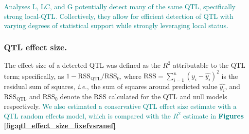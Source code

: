 \documentclass[9pt,twocolumn,twoside]{gsajnl}
\newcommand{\ie}{\emph{i.e.}\xspace}
\newcommand{\WV}[2]{\textcolor{red}{#1\footnote{\textcolor{red}{WV: #2}}}}
\newcommand{\GKinline}[1]{\textcolor{teal}{#1}}
\begin{document}
\GKinline{Analyses L, LC, and G potentially detect many of the same QTL, specifically strong local-QTL. Collectively, they allow for efficient detection of QTL with varying degrees of statistical support while strongly leveraging local status.}






\subsubsection{QTL effect size.}

The effect size of a detected QTL was defined as the $R^2$ attributable to the QTL term; specifically, as $1-\text{RSS}_\text{QTL} / \text{RSS}_0$, where $\text{RSS} = \sum_{i = 1}^{n}(y_{i} - \widehat{y_{i}})^{2}$ is the residual sum of squares, \ie, the sum of squares around predicted value $\widehat{y_i}$, and $\text{RSS}_{\text{QTL}}$ and $\text{RSS}_0$ denote the RSS calculated for the QTL and null models respectively. \GKinline{We also estimated a conservative QTL effect size estimate with a QTL random effects model, which is compared with the $R^{2}$ estimate in \textbf{Figures \ref{fig:qtl_effect_size_fixefvsranef}}}
\end{document}
